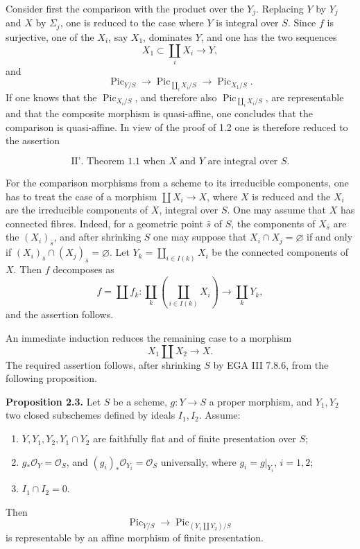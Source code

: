 \documentclass[11pt]{article}
\providecommand{\Pic}{\operatorname{Pic}}
\begin{document}
Consider first the comparison with the product over the \(Y_j\). Replacing \(Y\) by \(Y_j\) and \(X\) by \(\Sigma_j\), one is reduced to the case where \(Y\) is integral over \(S\). Since \(f\) is surjective, one of the \(X_i\), say \(X_1\), dominates \(Y\), and one has the two sequences
\[
  X_1\subset \coprod_i X_i\longrightarrow Y,
\]
and
\[
  \Pic_{Y/S}\longrightarrow \Pic_{\coprod_iX_i/S}\longrightarrow \Pic_{X_1/S}.
\]
If one knows that the \(\Pic_{X_i/S}\), and therefore also \(\Pic_{\coprod_iX_i/S}\), are representable and that the composite morphism is quasi-affine, one concludes that the comparison is quasi-affine. In view of the proof of 1.2 one is therefore reduced to the assertion

\[
\text{II'. Theorem 1.1 when }X\text{ and }Y\text{ are integral over }S.
\]

For the comparison morphisms from a scheme to its irreducible components, one has to treat the case of a morphism \(\coprod X_i\to X\), where \(X\) is reduced and the \(X_i\) are the irreducible components of \(X\), integral over \(S\). One may assume that \(X\) has connected fibres. Indeed, for a geometric point \(\bar s\) of \(S\), the components of \(X_{\bar s}\) are the \((X_i)_{\bar s}\), and after shrinking \(S\) one may suppose that \(X_i\cap X_j=\varnothing\) if and only if \((X_i)_{\bar s}\cap (X_j)_{\bar s}=\varnothing\). Let \(Y_k=\coprod_{i\in I(k)}X_i\) be the connected components of \(X\). Then \(f\) decomposes as
\[
  f=\coprod f_k:\coprod_k\left(\coprod_{i\in I(k)}X_i\right)\longrightarrow \coprod_k Y_k,
\]
and the assertion follows.

An immediate induction reduces the remaining case to a morphism
\[
  X_1\amalg X_2\longrightarrow X.
\]
The required assertion follows, after shrinking \(S\) by EGA III 7.8.6, from the following proposition.

\textbf{Proposition 2.3.} Let \(S\) be a scheme, \(g:Y\to S\) a proper morphism, and \(Y_1,Y_2\) two closed subschemes defined by ideals \(I_1,I_2\). Assume:
\begin{enumerate}[label=\alph*)]
\item \(Y,Y_1,Y_2,Y_1\cap Y_2\) are faithfully flat and of finite presentation over \(S\);
\item \(g_*\mathcal O_Y=\mathcal O_S\), and \((g_i)_*\mathcal O_{Y_i}=\mathcal O_S\) universally, where \(g_i=g|_{Y_i}\), \(i=1,2\);
\item \(I_1\cap I_2=0\).
\end{enumerate}
Then
\[
  \Pic_{Y/S}\longrightarrow \Pic_{(Y_1\amalg Y_2)/S}
\]
is representable by an affine morphism of finite presentation.
\end{document}
